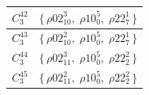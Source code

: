 \begin{longtable}{|c|l|}
  $C_{3}^{42}$ &
  $\{\, \rho02_{10}^{3},\; \rho10_{0}^{5},\; \rho22_{7}^{1} \,\}$ \\
  \hline

  $C_{3}^{43}$ &
  $\{\, \rho02_{10}^{2},\; \rho10_{0}^{5},\; \rho22_{7}^{1} \,\}$ \\
  \hline

  $C_{3}^{44}$ &
  $\{\, \rho02_{11}^{3},\; \rho10_{0}^{5},\; \rho22_{2}^{2} \,\}$ \\
  \hline

  $C_{3}^{45}$ &
  $\{\, \rho02_{11}^{2},\; \rho10_{0}^{5},\; \rho22_{2}^{2} \,\}$ \\
  \hline

\end{longtable}

